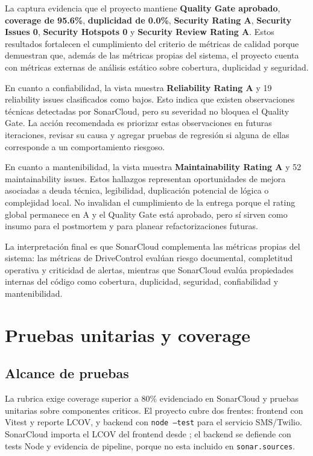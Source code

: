 \documentclass[11pt,a4paper]{article}
\begin{document}
La captura evidencia que el proyecto mantiene \textbf{Quality Gate aprobado}, \textbf{coverage de 95.6\%}, \textbf{duplicidad de 0.0\%}, \textbf{Security Rating A}, \textbf{Security Issues 0}, \textbf{Security Hotspots 0} y \textbf{Security Review Rating A}. Estos resultados fortalecen el cumplimiento del criterio de métricas de calidad porque demuestran que, además de las métricas propias del sistema, el proyecto cuenta con métricas externas de análisis estático sobre cobertura, duplicidad y seguridad.

En cuanto a confiabilidad, la vista muestra \textbf{Reliability Rating A} y 19 reliability issues clasificados como bajos. Esto indica que existen observaciones técnicas detectadas por SonarCloud, pero su severidad no bloquea el Quality Gate. La acción recomendada es priorizar estas observaciones en futuras iteraciones, revisar su causa y agregar pruebas de regresión si alguna de ellas corresponde a un comportamiento riesgoso.

En cuanto a mantenibilidad, la vista muestra \textbf{Maintainability Rating A} y 52 maintainability issues. Estos hallazgos representan oportunidades de mejora asociadas a deuda técnica, legibilidad, duplicación potencial de lógica o complejidad local. No invalidan el cumplimiento de la entrega porque el rating global permanece en A y el Quality Gate está aprobado, pero sí sirven como insumo para el postmortem y para planear refactorizaciones futuras.

La interpretación final es que SonarCloud complementa las métricas propias del sistema: las métricas de DriveControl evalúan riesgo documental, completitud operativa y criticidad de alertas, mientras que SonarCloud evalúa propiedades internas del código como cobertura, duplicidad, seguridad, confiabilidad y mantenibilidad.

\section{Pruebas unitarias y coverage}

\subsection{Alcance de pruebas}

La rubrica exige coverage superior a 80\% evidenciado en SonarCloud y pruebas unitarias sobre componentes criticos. El proyecto cubre dos frentes: frontend con Vitest y reporte LCOV, y backend con \texttt{node --test} para el servicio SMS/Twilio. SonarCloud importa el LCOV del frontend desde ; el backend se defiende con tests Node y evidencia de pipeline, porque no esta incluido en \texttt{sonar.sources}.
\end{document}

